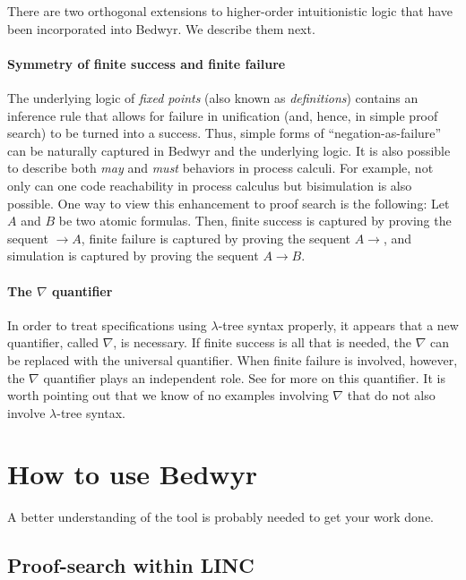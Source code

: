 \documentclass{article}
\begin{document}
\bigskip
There are two orthogonal extensions to higher-order intuitionistic
logic that have been incorporated into Bedwyr.   We describe them next.

\paragraph{Symmetry of finite success and finite failure}
The underlying logic of {\em fixed points} (also known as {\em
definitions})
\cite{girard92mail,schroeder-Heister93lics,mcdowell03tcs,momigliano03types}
contains an inference rule that allows for failure in unification
(and, hence, in simple proof search) to be turned into a success.
Thus, simple forms of ``negation-as-failure'' can be naturally
captured in Bedwyr and the underlying logic.  It is also possible to
describe both {\em may} and {\em must} behaviors in process calculi.
For example, not only can one code reachability in process calculus
but bisimulation is also possible.  One way to view this enhancement
to proof search is the following: Let $A$ and $B$ be two atomic
formulas.  Then, finite success is captured by proving the sequent
$\longrightarrow A$, finite failure is captured by proving the sequent
$A\longrightarrow$, and simulation is captured by proving the sequent
$A\longrightarrow B$.

\paragraph{The $\nabla$ quantifier}
In order to treat specifications using $\lambda$-tree syntax
properly, it appears that a new quantifier, called $\nabla$, is
necessary.  If finite success is all that is needed, the $\nabla$ can
be replaced with the universal quantifier.  When finite failure is
involved, however, the $\nabla$ quantifier plays an independent role.
See \cite{miller05tocl,tiu04phd,tiu05concur} for more on this
quantifier.  It is worth pointing out that we know of no examples
involving $\nabla$ that do not also involve $\lambda$-tree syntax.


\section{How to use Bedwyr}
\label{sec:howto}

A better understanding of the tool is probably needed to get your work
done. 

\subsection{Proof-search within LINC}
\label{psearch}
\end{document}
